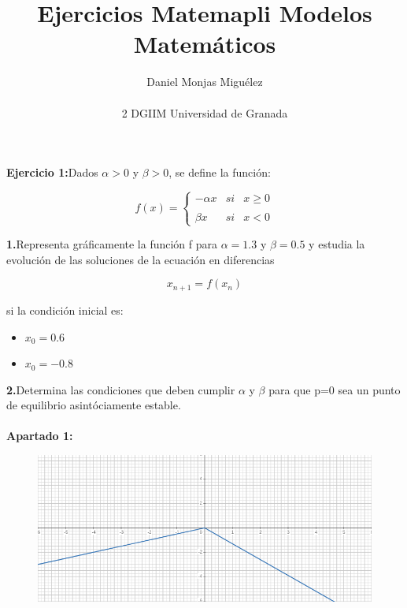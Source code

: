 \documentclass{article}
\author{Daniel Monjas Migu\'elez 
 		\\ \\ 2 DGIIM Universidad de Granada}
\title{Ejercicios Matemapli Modelos Matem\'aticos}
\begin{document}
\maketitle

\newpage

\textbf{Ejercicio 1:}Dados $\alpha > 0$ y $\beta > 0$, se define la función: 

\begin{equation*}
f(x)= \left\{ \begin{array}{lcc}
             -\alpha x &   si  & x \geq 0 \\
             \\ \beta x &  si & x < 0
             \end{array}
   \right.
\end{equation*}

\textbf{1.}Representa gráficamente la función f para $\alpha = 1.3$ y $\beta = 0.5$ y estudia la evolución de las soluciones de la ecuación en diferencias

\begin{equation*}
x_{n+1} = f(x_n)
\end{equation*}

si la condición inicial es:

\begin{itemize}
\item $x_0 = 0.6$
\item $x_0 = -0.8$
\end{itemize}

\textbf{2.}Determina las condiciones que deben cumplir $\alpha$ y $\beta$ para que p=0 sea un punto de equilibrio asintóciamente estable. \\ \\

\textbf{Apartado 1:}
\begin{figure}[h]
\centering
\includegraphics[width=1\textwidth ,scale=1]{funcion_matemapli.png}
\end{figure}
\end{document}

